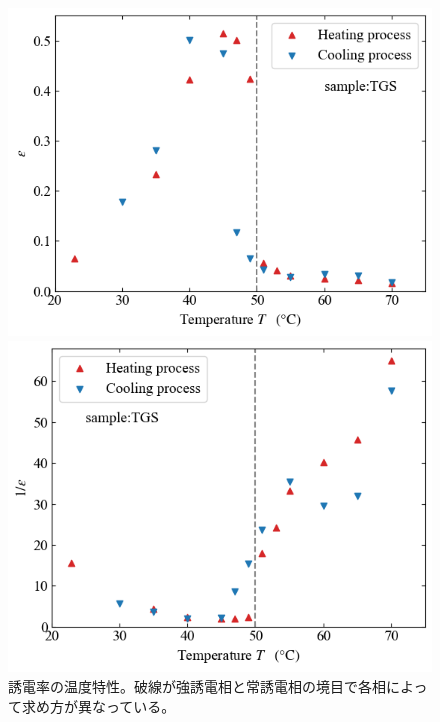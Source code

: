 \documentclass[9pt,dvipdfmx,a4paper]{jsarticle}
\begin{document}
\begin{figure}[H]
    \begin{minipage}[t]{0.48\columnwidth}
        \centering
        \includegraphics[width=\columnwidth]{TGS_epsilon-T.png}
    \end{minipage}
    \hfill
    \begin{minipage}[t]{0.48\columnwidth}
        \centering
        \includegraphics[width=\columnwidth]{TGS_epsilon1-T.png}
    \end{minipage}
    \caption{\small{誘電率の温度特性。破線が強誘電相と常誘電相の境目で各相によって求め方が異なっている。}}
    \label{graph:TGS_epsilon-T}
\end{figure}
\end{document}
